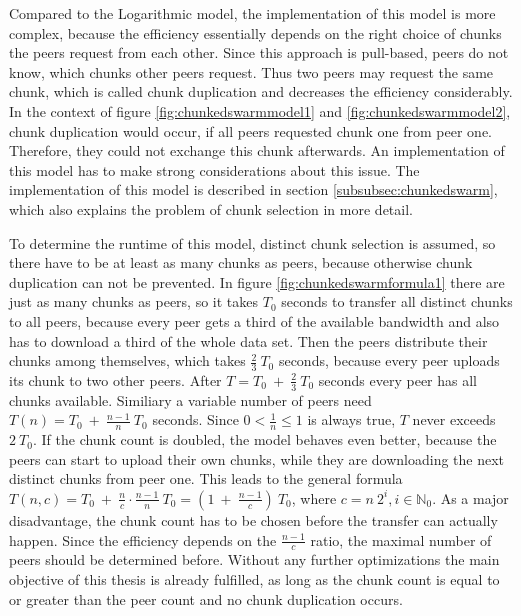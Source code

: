 Compared to the Logarithmic model, the implementation of this model is more complex, because the efficiency essentially depends on the right choice of chunks the peers request from each other. Since this approach is pull-based, peers do not know, which chunks other peers request. Thus two peers may request the same chunk, which is called chunk duplication and decreases the efficiency considerably. In the context of figure \ref{fig:chunkedswarmmodel1} and \ref{fig:chunkedswarmmodel2}, chunk duplication would occur, if all peers requested chunk one from peer one. Therefore, they could not exchange this chunk afterwards. An implementation of this model has to make strong considerations about this issue. The implementation of this model is described in section \ref{subsubsec:chunkedswarm}, which also explains the problem of chunk selection in more detail. 

To determine the runtime of this model, distinct chunk selection is assumed, so there have to be at least as many chunks as peers, because otherwise chunk duplication can not be prevented. In figure \ref{fig:chunkedswarmformula1} there are just as many chunks as peers, so it takes $T_0$ seconds to transfer all distinct chunks to all peers, because every peer gets a third of the available bandwidth and also has to download a third of the whole data set. Then the peers distribute their chunks among themselves, which takes $\frac{2}{3}\:T_0$ seconds, because every peer uploads its chunk to two other peers. After $T = T_0\:+\:\frac{2}{3}\:T_0$ seconds every peer has all chunks available. Similiary a variable number of peers need $T(n) = T_0\:+\:\frac{n - 1}{n}\:T_0$ seconds. Since $0 < \frac{1}{n} \leq 1$ is always true, $T$ never exceeds $2\:T_0$. If the chunk count is doubled, the model behaves even better, because the peers can start to upload their own chunks, while they are downloading the next distinct chunks from peer one. This leads to the general formula $T(n, c) = T_0\:+\:\frac{n}{c} \cdot \frac{n-1}{n}\:T_0 = (1\:+\:\frac{n-1}{c})\:T_0$, where $c = n\:2^i, i \in \mathbb{N}_0$. As a major disadvantage, the chunk count has to be chosen before the transfer can actually happen. Since the efficiency depends on the $\frac{n-1}{c}$ ratio, the maximal number of peers should be determined before. Without any further optimizations the main objective of this thesis is already fulfilled, as long as the chunk count is equal to or greater than the peer count and no chunk duplication occurs.

